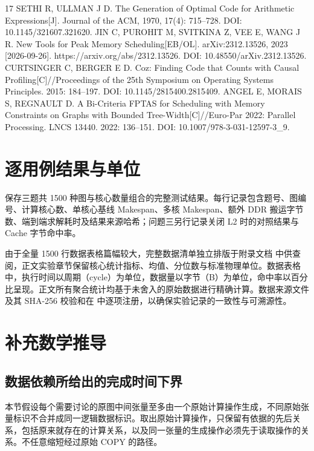 \documentclass[anonymous,notoc]{gmcm2026}
\begin{document}
\begin{thebibliography}{17}
 SETHI R, ULLMAN J D. The Generation of Optimal Code for Arithmetic Expressions{[}J{]}. Journal of the ACM, 1970, 17(4): 715--728. DOI: 10.1145/321607.321620.
 JIN C, PUROHIT M, SVITKINA Z, VEE E, WANG J R. New Tools for Peak Memory Scheduling{[}EB/OL{]}. arXiv:2312.13526, 2023 {[}2026-09-26{]}. https://arxiv.org/abs/2312.13526. DOI: 10.48550/arXiv.2312.13526.
 CURTSINGER C, BERGER E D. Coz: Finding Code that Counts with Causal Profiling{[}C{]}//Proceedings of the 25th Symposium on Operating Systems Principles. 2015: 184--197. DOI: 10.1145/2815400.2815409.
 ANGEL E, MORAIS S, REGNAULT D. A Bi-Criteria FPTAS for Scheduling with Memory Constraints on Graphs with Bounded Tree-Width{[}C{]}//Euro-Par 2022: Parallel Processing. LNCS 13440. 2022: 136--151. DOI: 10.1007/978-3-031-12597-3\_9.
\end{thebibliography}

\appendix
\FloatBarrier
\section{逐用例结果与单位}

\texttt{} 保存三题共 1500 种图与核心数量组合的完整测试结果。每行记录包含题号、图编号、计算核心数、单核心基线 Makespan、多核 Makespan、额外 DDR 搬运字节数、端到端求解耗时及结果来源哈希；问题三另行记录关闭 L2 时的对照结果与 Cache 字节命中率。

由于全量 1500 行数据表格篇幅较大，完整数据清单独立排版于附录文档 \texttt{} 中供查阅，正文实验章节保留核心统计指标、均值、分位数与标准物理单位。数据表格中，执行时间以周期（cycle）为单位，数据量以字节（B）为单位，命中率以百分比呈现。正文所有聚合统计均基于未舍入的原始数据进行精确计算。数据来源文件及其 SHA-256 校验和在 \texttt{} 中逐项注册，以确保实验记录的一致性与可溯源性。

\FloatBarrier
\section{补充数学推导}

\subsection{数据依赖所给出的完成时间下界}

本节假设每个需要讨论的原图中间张量至多由一个原始计算操作生成，不同原始张量标识不合并成同一逻辑数据标识。取出原始计算操作，只保留有依据的先后关系，包括原来就存在的计算关系，以及同一张量的生成操作必须先于读取操作的关系。不任意缩短经过原始 COPY 的路径。
\end{document}
